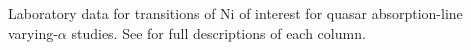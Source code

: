 Laboratory data for transitions of Ni of interest for quasar absorption-line varying-$\alpha$ studies. See  for full descriptions of each column.
